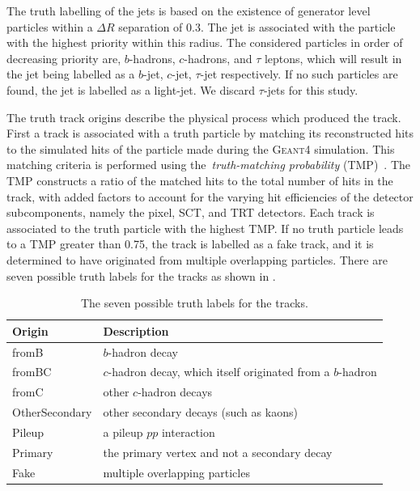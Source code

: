 The truth labelling of the jets is based on the existence of generator level particles within a $\Delta R$ separation of 0.3.
The jet is associated with the particle with the highest priority within this radius.
The considered particles in order of decreasing priority are, $b$-hadrons, $c$-hadrons, and $\tau$ leptons, which will result in the jet being labelled as a $b$-jet, $c$-jet, $\tau$-jet respectively.
If no such particles are found, the jet is labelled as a light-jet.
We discard $\tau$-jets for this study.

The truth track origins describe the physical process which produced the track.
First a track is associated with a truth particle by matching its reconstructed hits to the simulated hits of the particle made during the \textsc{Geant4} simulation.
This matching criteria is performed using the~\textit{truth-matching probability} (TMP)~\cite{TMP}.
The TMP constructs a ratio of the matched hits to the total number of hits in the track, with added factors to account for the varying hit efficiencies of the detector subcomponents, namely the pixel, SCT, and TRT detectors.
Each track is associated to the truth particle with the highest TMP.
If no truth particle leads to a TMP greater than 0.75, the track is labelled as a fake track, and it is determined to have originated from multiple overlapping particles.
There are seven possible truth labels for the tracks as shown in .

\begin{table}
    \centering
    \begin{tabular}{ll}
        \toprule
        \midrule
        Origin & Description \\
        \midrule
        fromB & $b$-hadron decay \\
        fromBC & $c$-hadron decay, which itself originated from a $b$-hadron \\
        fromC & other $c$-hadron decays \\
        OtherSecondary & other secondary decays (such as kaons) \\
        Pileup & a pileup $pp$ interaction \\
        Primary & the primary vertex and not a secondary decay \\
        Fake & multiple overlapping particles \\
        \bottomrule
    \end{tabular}
    \caption{The seven possible truth labels for the tracks.}
    \label{tab:track_labels}
\end{table}

